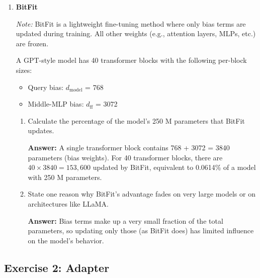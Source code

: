 \documentclass[11pt]{article}
\begin{document}
\begin{enumerate}[label=(\alph*)]
\begin{enumerate}[label=(\roman*)]
        \textbf{Answer:} Total memory for the \textit{dense} differentiable mask: \(350 \times 10^6 \times\) size of FP32 (4 bytes) \(\approx\) 1335.14 MB.

        \item If you could store the final mask as a packed 1-bit tensor for inference, what would its size be (in kB)?
        
        \textbf{Answer: } Total memory for the final mask: \(350 \times 10^6 \times 1\) bit = 42,675.78 kB.
    \end{enumerate}

    \item \textbf{BitFit}
    
    \textit{Note:} BitFit is a lightweight fine-tuning method where only bias terms are updated during training. All other weights (e.g., attention layers, MLPs, etc.) are frozen.
    
    A GPT-style model has 40 transformer blocks with the following per-block sizes:
    \begin{itemize}
        \item Query bias: \(d_\text{model}\) = 768
        \item Middle-MLP bias: \(d_\text{ff}\) = 3072
    \end{itemize}

    \begin{enumerate}[label=(\roman*)]
        \item Calculate the percentage of the model's 250 M parameters that BitFit updates. 
        
        \textbf{Answer:} A single transformer block contains 768 + 3072 = 3840 parameters (bias weights). For 40 transformer blocks, there are \(40 \times 3840 = 153,600\) updated by BitFit, equivalent to 0.0614\% of a model with 250 M parameters.

        \item State one reason why BitFit's advantage fades on very large models or on architectures like LLaMA.
        
        \textbf{Answer:} Bias terms make up a very small fraction of the total parameters, so updating only those (as BitFit does) has limited influence on the model's behavior.
    \end{enumerate}
\end{enumerate}

\subsection*{Exercise 2: Adapter}
\end{document}
